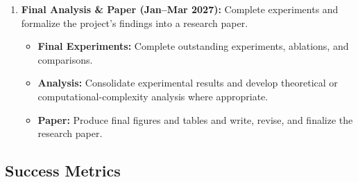 \documentclass{article}
\begin{document}
\begin{enumerate}
\item \textbf{Final Analysis \& Paper (Jan--Mar 2027):} Complete experiments and formalize the project's findings into a research paper.

\begin{itemize}
    \item \textbf{Final Experiments:} Complete outstanding experiments, ablations, and comparisons.
    \item \textbf{Analysis:} Consolidate experimental results and develop theoretical or computational-complexity analysis where appropriate.
    \item \textbf{Paper:} Produce final figures and tables and write, revise, and finalize the research paper.
\end{itemize}


\end{enumerate}

\subsection{Success Metrics}
\end{document}
